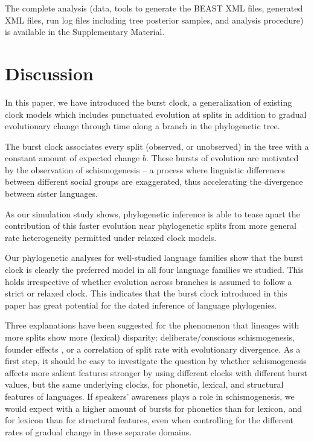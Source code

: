 \documentclass[]{rsos}%
\begin{document}
The complete analysis (data, tools to generate the BEAST XML files, generated XML files,
run log files including tree posterior samples, and analysis procedure) is
available in the Supplementary Material.

\section{Discussion}\label{s:discussion}

In this paper, we have introduced the burst clock, a generalization of existing clock models which includes punctuated evolution at splits in addition to gradual evolutionary change through time along a branch in the phylogenetic tree.

The burst clock associates every split (observed, or unobserved) in the tree with a constant amount of expected change $b$. These bursts of evolution are motivated by the observation of schismogenesis -- a process where linguistic differences between different social groups are exaggerated, thus accelerating the divergence between sister languages.

As our simulation study shows, phylogenetic inference is able to tease apart the
contribution of this faster evolution near phylogenetic splits from more general rate heterogeneity permitted under relaxed clock models.

Our phylogenetic analyses for well-studied language families show that the
burst clock is clearly the preferred model in all four language families we
studied. This holds irrespective of whether evolution across branches is assumed
to follow a strict or relaxed clock.
This indicates that the burst clock introduced in this paper has great potential for
the dated inference of language phylogenies.

Three
explanations have been suggested for the phenomenon that lineages with more
splits show more (lexical) disparity: deliberate/conscious schismogenesis,
founder effects \parencite{atkinson2008languages,greenhill2017evolutionary},
or a correlation of split rate with evolutionary divergence.
As a first step, it should be easy to investigate the question by
\textcite{gray2013three} whether schismogenesis affects more salient features
stronger by using different clocks with different burst values, but the same
underlying clocks, for phonetic, lexical, and structural features of languages.
If speakers' awareness plays a role in schismogenesis, we would expect with
\citeauthor{gray2013three} a higher amount of bursts for phonetics than for
lexicon, and for lexicon than for structural features, even when controlling for
the different rates of gradual change in these separate domains.
\end{document}
